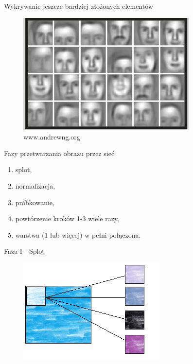 \documentclass[xcolor=dvipsnames]{beamer}
\begin{document}
\begin{frame}{Wykrywanie jeszcze bardziej złożonych elementów }
	\begin{figure}
		\includegraphics[width=\linewidth, height=0.7\textheight, keepaspectratio] {img/hierarchical-learning4.jpg}
		\caption{www.andrewng.org}
	\end{figure}
\end{frame}

\begin{frame}{Fazy przetwarzania obrazu przez sieć}
	\begin{enumerate}
		\item splot,
		\item normalizacja,
		\item próbkowanie,
		\item powtórzenie kroków 1-3 wiele razy,
		\item warstwa (1 lub więcej) w pełni połączona.
	\end{enumerate}
\end{frame}

\begin{frame}{Faza I - Splot}
	\begin{figure}
		\includegraphics[width=\linewidth, height=0.7\textheight, keepaspectratio] {img/convolution.png}
	\end{figure}
\end{frame}
\end{document}
